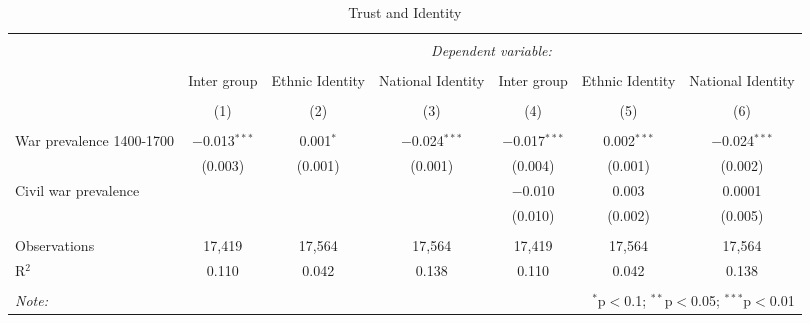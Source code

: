 
\begin{table}[!htbp] \centering 
  \caption{Trust and Identity} 
  \label{} 
\footnotesize 
\begin{tabular}{@{\extracolsep{2pt}}lcccccc} 
\\[-1.8ex]\hline 
\hline \\[-1.8ex] 
 & \multicolumn{6}{c}{\textit{Dependent variable:}} \\ 
\cline{2-7} 
\\[-1.8ex] & Inter group & Ethnic Identity & National Identity & Inter group & Ethnic Identity & National Identity \\ 
\\[-1.8ex] & (1) & (2) & (3) & (4) & (5) & (6)\\ 
\hline \\[-1.8ex] 
 War prevalence 1400-1700 & $-$0.013$^{***}$ & 0.001$^{*}$ & $-$0.024$^{***}$ & $-$0.017$^{***}$ & 0.002$^{***}$ & $-$0.024$^{***}$ \\ 
  & (0.003) & (0.001) & (0.001) & (0.004) & (0.001) & (0.002) \\ 
  Civil war prevalence &  &  &  & $-$0.010 & 0.003 & 0.0001 \\ 
  &  &  &  & (0.010) & (0.002) & (0.005) \\ 
 \hline \\[-1.8ex] 
Observations & 17,419 & 17,564 & 17,564 & 17,419 & 17,564 & 17,564 \\ 
R$^{2}$ & 0.110 & 0.042 & 0.138 & 0.110 & 0.042 & 0.138 \\ 
\hline 
\hline \\[-1.8ex] 
\textit{Note:}  & \multicolumn{6}{r}{$^{*}$p$<$0.1; $^{**}$p$<$0.05; $^{***}$p$<$0.01} \\ 
\end{tabular} 
\end{table} 
